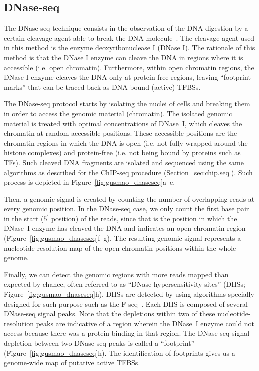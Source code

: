 \subsection{DNase-seq}
\label{sec:dnase.seq}

The DNase-seq technique consists in the observation of the DNA digestion by a certain cleavage agent able to break the DNA molecule~\citep{crawford2004,sabo2004a}. The cleavage agent used in this method is the enzyme deoxyribonuclease I (DNase I). The rationale of this method is that the DNase I enzyme can cleave the DNA in regions where it is accessible (i.e. open chromatin). Furthermore, within open chromatin regions, the DNase I enzyme cleaves the DNA only at protein-free regions, leaving ``footprint marks'' that can be traced back as DNA-bound (active) TFBSs.

The DNase-seq protocol starts by isolating the nuclei of cells and breaking them in order to access the genomic material (chromatin). The isolated genomic material is treated with optimal concentrations of DNase~I, which cleaves the chromatin at random accessible positions. These accessible positions are the chromatin regions in which the DNA is open (i.e. not fully wrapped around the histone complexes) and protein-free (i.e. not being bound by proteins such as TFs). Such cleaved DNA fragments are isolated and sequenced using the same algorithms as described for the ChIP-seq procedure (Section~\ref{sec:chip.seq}). Such process is depicted in Figure~\ref{fig:gusmao_dnaseseq}a--e.

Then, a genomic signal is created by counting the number of overlapping reads at every genomic position. In the DNase-seq case, we only count the first base pair in the start ($5^{\prime}$ position) of the reads, since that is the position in which the DNase~I enzyme has cleaved the DNA and indicates an open chromatin region (Figure~\ref{fig:gusmao_dnaseseq}f--g). The resulting genomic signal represents a nucleotide-resolution map of the open chromatin positions within the whole genome.

Finally, we can detect the genomic regions with more reads mapped than expected by chance, often referred to as ``DNase hypersensitivity sites'' (DHSs; Figure~\ref{fig:gusmao_dnaseseq}h). DHSs are detected by using algorithms specially designed for such purpose such as the F-seq~\citep{boyle2008b}. Each DHS is composed of several DNase-seq signal peaks. Note that the depletions within two of these nucleotide-resolution peaks are indicative of a region wherein the DNase~I enzyme could not access because there was a protein binding in that region. The DNase-seq signal depletion between two DNase-seq peaks is called a ``footprint'' (Figure~\ref{fig:gusmao_dnaseseq}h). The identification of footprints gives us a genome-wide map of putative active TFBSs.

